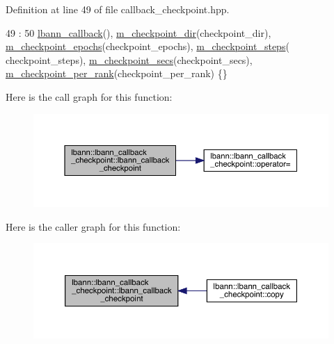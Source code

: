 Definition at line 49 of file callback\+\_\+checkpoint.\+hpp.


\begin{DoxyCode}
49                                                                                                            
                                             : 
50     \hyperlink{classlbann_1_1lbann__callback_a679057298a41ddd47f08c157f756c584}{lbann\_callback}(), \hyperlink{classlbann_1_1lbann__callback__checkpoint_ac89386fda60744e6399f97003fea3711}{m\_checkpoint\_dir}(checkpoint\_dir), 
      \hyperlink{classlbann_1_1lbann__callback__checkpoint_ad6f4399effadedb26e33fc39a3c6915e}{m\_checkpoint\_epochs}(checkpoint\_epochs), \hyperlink{classlbann_1_1lbann__callback__checkpoint_ad6debea7d9bbebd3ee0323acec11516f}{m\_checkpoint\_steps}(
      checkpoint\_steps), \hyperlink{classlbann_1_1lbann__callback__checkpoint_a285658a96f8546952c9016ef4cc12161}{m\_checkpoint\_secs}(checkpoint\_secs), 
      \hyperlink{classlbann_1_1lbann__callback__checkpoint_a36af7331ddf213339fe7282cb53ffedc}{m\_checkpoint\_per\_rank}(checkpoint\_per\_rank) \{\}
\end{DoxyCode}
Here is the call graph for this function\+:\nopagebreak
\begin{figure}[H]
\begin{center}
\leavevmode
\includegraphics[width=350pt]{classlbann_1_1lbann__callback__checkpoint_a865e633d1f041e3f2e5465b1d05f3603_cgraph}
\end{center}
\end{figure}
Here is the caller graph for this function\+:\nopagebreak
\begin{figure}[H]
\begin{center}
\leavevmode
\includegraphics[width=350pt]{classlbann_1_1lbann__callback__checkpoint_a865e633d1f041e3f2e5465b1d05f3603_icgraph}
\end{center}
\end{figure}
\mbox{\label{classlbann_1_1lbann__callback__checkpoint_a954c1b3f33fc293151d5bf37a8053628}} 
